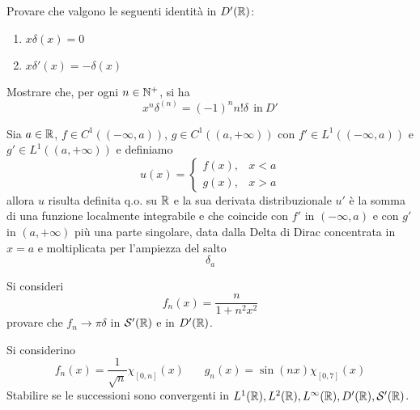 Provare che valgono le seguenti identità in $D'(\mathbb{R})$:
\begin{enumerate}
\item $x\delta (x) = 0$
\item $x\delta '(x) = - \delta (x)$
\end{enumerate}

Mostrare che, per ogni $n\in \mathbb{N} ^{ + }$, si ha
\begin{equation*}
\boxed{x^{n} \delta ^{(n)} = (- 1)^{n} n!\delta \ \ \text{in} \ D'}
\end{equation*}

Sia $a\in \mathbb{R} $, $f\in C^{1}((- \infty ,a))$, $g\in C^{1}((a, + \infty))$ con $f'\in L^{1}((- \infty ,a))$ e $g'\in L^{1}((a, + \infty))$ e definiamo
\begin{equation*}
u(x) = 
\begin{cases}
f(x) , & x < a\\
g(x) , & x > a
\end{cases}
\end{equation*}
allora $u$ risulta definita q.o. su $\mathbb{R} $ e la sua derivata distribuzionale $u'$ è la somma di una funzione localmente integrabile e che coincide con $f'$ in $(- \infty ,a)$ e con $g'$ in $(a, + \infty)$ più una parte singolare, data dalla Delta di Dirac concentrata in $x = a$ e moltiplicata per l'ampiezza del salto
\begin{equation*}
[ u(a_{ + }) - u(a_{ - })] \delta _{a}
\end{equation*}
\Esercizio{}

Si consideri
\begin{equation*}
f_{n}(x) = \frac{n}{1 + n^{2} x^{2}}
\end{equation*}
provare che $f_{n}\rightarrow \pi \delta $ in $\mathcal{S}  '(\mathbb{R})$ e in $D'(\mathbb{R})$.
\Esercizio{}

Si considerino
\begin{equation*}
f_{n}(x) = \frac{1}{\sqrt{n}} \chi _{[ 0,n]}(x) \ \ \ \ \ \ \ \ g_{n}(x) = \sin(nx) \chi _{[ 0,7]}(x)
\end{equation*}
Stabilire se le successioni sono convergenti in $L^{1}(\mathbb{R}) ,L^{2}(\mathbb{R}) ,L^{\infty }(\mathbb{R}) ,D'(\mathbb{R}) ,\mathcal{S}  '(\mathbb{R})$.
\Esercizio{}

